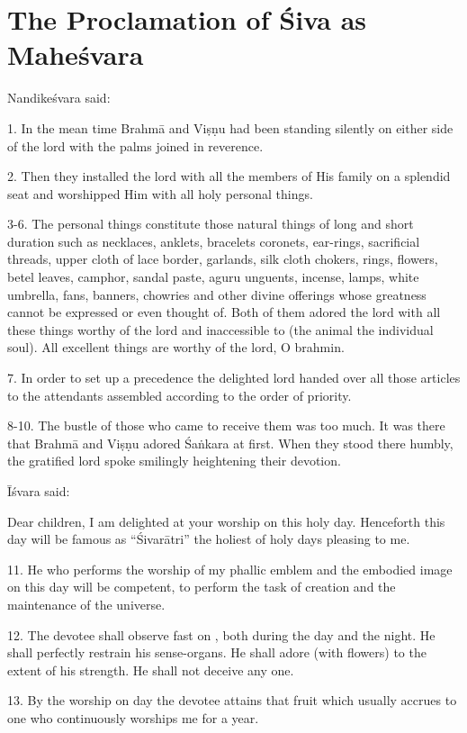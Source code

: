 \chapter{The Proclamation of Śiva as Maheśvara}

Nandikeśvara said:

1. In the mean time Brahmā and Viṣṇu had been standing silently on either side
of the lord with the palms joined in reverence.

2. Then they installed the lord with all the members of His family on a splendid
seat and worshipped Him with all holy personal things.

3-6. The personal things constitute those natural things of long and short
duration such as necklaces, anklets, bracelets coronets, ear-rings, sacrificial
threads, upper cloth of lace border, garlands, silk cloth chokers, rings,
flowers, betel leaves, camphor, sandal paste, aguru unguents, incense, lamps,
white umbrella, fans, banners, chowries and other divine offerings whose
greatness cannot be expressed or even thought of. Both of them adored the lord
with all these things worthy of the lord and inaccessible to 
(the animal \ie the individual soul). All excellent things are worthy of
the lord, O brahmin.

7. In order to set up a precedence the delighted lord handed over all those
articles to the attendants assembled according to the order of priority.

8-10. The bustle of those who came to receive them was too much. It was there
that Brahmā and Viṣṇu adored Śaṅkara at first. When they stood there humbly,
the gratified lord spoke smilingly heightening their devotion.

Īśvara said:

Dear children, I am delighted at your worship on this holy day. Henceforth this
day will be famous as “Śivarātri” the holiest of holy days pleasing to me.

11. He who performs the worship of my phallic emblem and the embodied image on
this day will be competent, to perform the task of creation and the maintenance
\etc of the universe.

12. The devotee shall observe fast on , both during the day and
the night. He shall perfectly restrain his sense-organs. He shall adore (with
flowers) to the extent of his strength. He shall not deceive any one.

13. By the worship on  day the devotee attains that fruit which
usually accrues to one who continuously worships me for a year.

